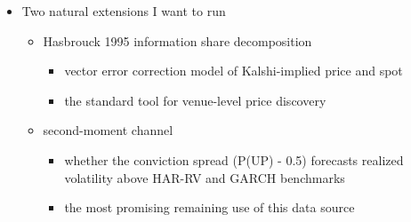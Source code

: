 \documentclass[
]{article}
\providecommand{\tightlist}{%
  \setlength{\itemsep}{0pt}\setlength{\parskip}{0pt}}
\begin{document}
\begin{itemize}
\begin{itemize}
    \begin{itemize}
    \tightlist
    \item
      cluster bootstrap by contract preserves within-contract dependence
    \item
      but treats contracts as independent draws across calendar time
    \item
      adjacent contracts share macro state
    \item
      a calendar-time block bootstrap would be more conservative
    \item
      the qualitative findings are robust but headline magnitudes could
      tighten
    \end{itemize}
  \item
    Generalizability:

    \begin{itemize}
    \tightlist
    \item
      6 weeks of moderate volatility is one regime
    \item
      the 2-min lag and the 0.10 AUC gap should not be treated as
      structural until they replicate during stress events (CPI
      releases, BTC-specific news shocks)
    \end{itemize}
  \end{itemize}
\item
  Two natural extensions I want to run

  \begin{itemize}
  \tightlist
  \item
    Hasbrouck 1995 information share decomposition

    \begin{itemize}
    \tightlist
    \item
      vector error correction model of Kalshi-implied price and spot
    \item
      the standard tool for venue-level price discovery
    \end{itemize}
  \item
    second-moment channel

    \begin{itemize}
    \tightlist
    \item
      whether the conviction spread (\textbar P(UP) - 0.5\textbar)
      forecasts realized volatility above HAR-RV and GARCH benchmarks
    \item
      the most promising remaining use of this data source
    \end{itemize}
  \end{itemize}
\end{itemize}
\end{document}
